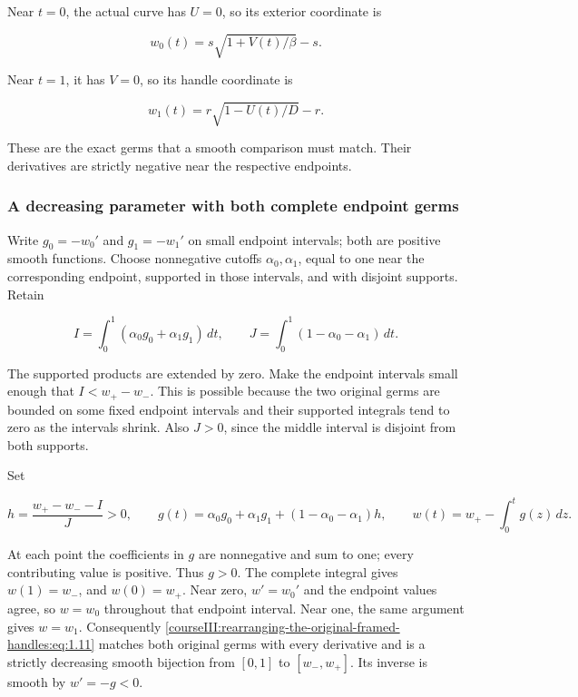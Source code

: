 Near \(t=0\), the actual curve has \(U=0\), so its exterior coordinate is

\[
w_0(t)=s\sqrt{1+V(t)/\beta}-s.
\]

Near \(t=1\), it has \(V=0\), so its handle coordinate is

\begin{equation}
w_1(t)=r\sqrt{1-U(t)/D}-r.
\label{courseIII:rearranging-the-original-framed-handles:eq:1.9}
\end{equation}

These are the exact germs that a smooth comparison must match. Their derivatives are strictly negative near the respective endpoints.

\subsubsection{A decreasing parameter with both complete endpoint germs}
\label{courseIII:rearranging-the-original-framed-handles:section-1.2}

Write \(g_0=-w_0'\) and \(g_1=-w_1'\) on small endpoint intervals; both are positive smooth functions. Choose nonnegative cutoffs \(\alpha_0,\alpha_1\), equal to one near the corresponding endpoint, supported in those intervals, and with disjoint supports. Retain

\begin{equation}
I=\int_0^1(\alpha_0g_0+\alpha_1g_1)\,dt,\qquad
J=\int_0^1(1-\alpha_0-\alpha_1)\,dt.
\label{courseIII:rearranging-the-original-framed-handles:eq:1.10}
\end{equation}

The supported products are extended by zero. Make the endpoint intervals small enough that \(I<w_+-w_-\). This is possible because the two original germs are bounded on some fixed endpoint intervals and their supported integrals tend to zero as the intervals shrink. Also \(J>0\), since the middle interval is disjoint from both supports.

Set

\begin{equation}
h=\frac{w_+-w_--I}{J}>0,\qquad
g(t)=\alpha_0g_0+\alpha_1g_1+(1-\alpha_0-\alpha_1)h,
\qquad
w(t)=w_+-\int_0^t g(z)\,dz.
\label{courseIII:rearranging-the-original-framed-handles:eq:1.11}
\end{equation}

At each point the coefficients in \(g\) are nonnegative and sum to one; every contributing value is positive. Thus \(g>0\). The complete integral gives \(w(1)=w_-\), and \(w(0)=w_+\). Near zero, \(w'=w_0'\) and the endpoint values agree, so \(w=w_0\) throughout that endpoint interval. Near one, the same argument gives \(w=w_1\). Consequently \eqref{courseIII:rearranging-the-original-framed-handles:eq:1.11} matches both original germs with every derivative and is a strictly decreasing smooth bijection from \([0,1]\) to \([w_-,w_+]\). Its inverse is smooth by \(w'=-g<0\).

